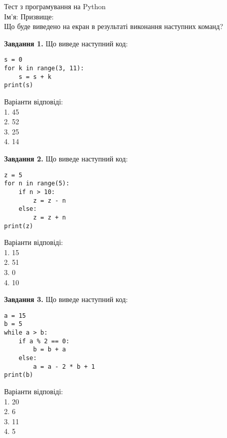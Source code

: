 \documentclass{article}
\begin{document}
\begin{center}
    \LARGE Тест з програмування на Python \\
    \vspace{0.5em}
    Ім'я: \underline{\hspace{4cm}} Призвище: \underline{\hspace{4cm}} \\
    \vspace{0.5em}
    Що буде виведено на екран в результаті виконання наступних команд?
\end{center}

\begin{multicols}{2}

\begin{tcolorbox}[rounded corners, top=1mm, bottom=1mm]
\textbf{Завдання 1.} Що виведе наступний код:
\begin{verbatim}
s = 0
for k in range(3, 11):
    s = s + k
print(s)
\end{verbatim}
Варіанти відповіді: \\
1. 45 \\
2. 52 \\
3. 25 \\
4. 14 \\
\end{tcolorbox}

\begin{tcolorbox}[rounded corners, top=1mm, bottom=1mm]
\textbf{Завдання 2.} Що виведе наступний код:
\begin{verbatim}
z = 5
for n in range(5):
    if n > 10:
        z = z - n
    else:
        z = z + n
print(z)
\end{verbatim}
Варіанти відповіді: \\
1. 15 \\
2. 51 \\
3. 0 \\
4. 10 \\
\end{tcolorbox}

\begin{tcolorbox}[rounded corners, top=1mm, bottom=1mm]
\textbf{Завдання 3.} Що виведе наступний код:
\begin{verbatim}
a = 15
b = 5
while a > b:
    if a % 2 == 0:
        b = b + a
    else:
        a = a - 2 * b + 1
print(b)
\end{verbatim}
Варіанти відповіді: \\
1. 20 \\
2. 6 \\
3. 11 \\
4. 5 \\
\end{tcolorbox}


\end{multicols}
\end{document}
